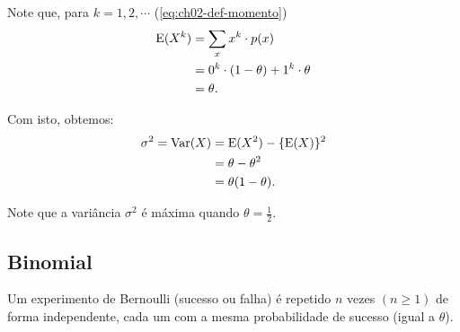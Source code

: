 Note que, para $k = 1, 2, \cdots$ (\cref{eq:ch02-def-momento})
\begin{align*}
    \operatorname{E}(X^k) &= \sum_x x^k \cdot p(x) \\
    & = 0^k \cdot(1-\theta) + 1^k\cdot\theta \\
    &= \theta.
\end{align*}

Com isto, obtemos:
\begin{align*}
    \sigma^2 = \operatorname{Var}(X) &= \operatorname{E}(X^2) - \{\operatorname{E}(X)\}^2 \\
    &= \theta - \theta^2 \\
    &= \theta(1-\theta).
\end{align*}

\begin{obs}
    Note que a variância $\sigma^2$ é máxima quando $\theta = \frac{1}{2}$.
    
    \begin{center}
    \end{center}
\end{obs}

\subsection{Binomial}

Um experimento de Bernoulli (sucesso ou falha) é repetido $n$ vezes
$(n \ge 1)$ de forma independente, cada um com a mesma probabilidade
de sucesso (igual a $\theta$).

